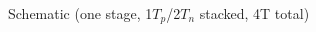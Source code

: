 \begin{center}
    Schematic (one stage, 1$T_{p}$/2$T_{n}$ stacked, 4T total)
    \begin{figure}[h] %
        \begin{center}
            \begin{circuitdiagram}{24}{21}
            \end{circuitdiagram}
        \end{center}
    \end{figure}
\end{center}
